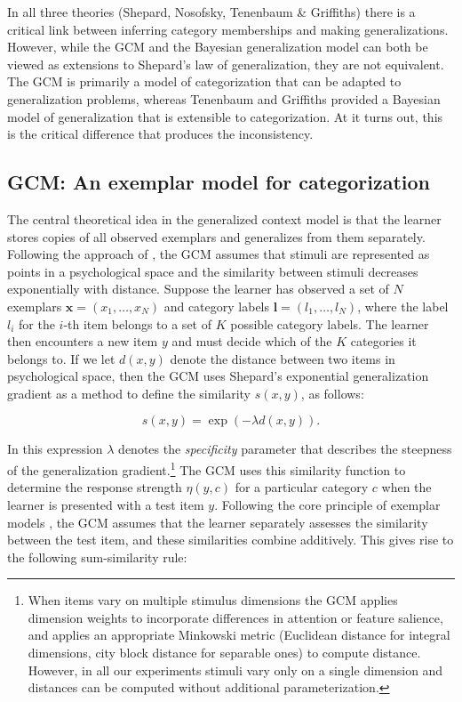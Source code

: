 \documentclass[doc,apacite]{apa6}
\begin{document}
In all three theories (Shepard, Nosofsky, Tenenbaum \& Griffiths) there is a critical link between inferring category memberships and making generalizations. However, while the GCM and the Bayesian generalization model can both be viewed as extensions to Shepard's law of generalization, they are not equivalent. The GCM is primarily a model of categorization that can be adapted to generalization problems, whereas Tenenbaum and Griffiths provided a Bayesian model of generalization that is extensible to categorization. At it turns out, this is the critical difference that produces the inconsistency.

\subsection{GCM: An exemplar model for categorization}

The central theoretical idea in the generalized context model is that the learner stores copies of all observed exemplars and generalizes from them separately. Following the approach of , the GCM assumes that stimuli are represented as points in a psychological space and the similarity between stimuli decreases exponentially with distance. Suppose the learner has observed a set of $N$ exemplars $\bm{x}=(x_1,\ldots,x_N)$ and category labels $\bm{l}=(l_1,\ldots,l_N)$, where the label $l_i$ for the $i$-th item belongs to a set of $K$ possible category labels. The learner then encounters a new item $y$ and must decide which of the $K$ categories it belongs to. If we let $d(x,y)$ denote the distance between two items in psychological space, then the GCM uses Shepard's exponential generalization gradient as a method to define the similarity $s(x,y)$, as follows:

\begin{equation}
\label{gcm1}
s(x,y) = \exp( -\lambda d(x,y) ).
\end{equation}

In this expression $\lambda$ denotes the {\it specificity} parameter that describes the steepness of the generalization gradient.\footnote{When items vary on multiple stimulus dimensions the GCM applies dimension weights to incorporate differences in attention or feature salience, and applies an appropriate Minkowski metric
(Euclidean distance for integral dimensions, city block distance for separable ones)
to compute distance. However, in all our experiments stimuli vary only on a single dimension and distances can be computed without additional parameterization.}
The GCM uses this similarity function to determine the response strength $\eta(y,c)$ for a particular category $c$ when the learner is presented with a test item $y$. Following the core principle of exemplar models \cite{medin1978context}, the GCM assumes that the learner separately assesses the similarity between the test item, and these similarities combine additively. This gives rise to the following sum-similarity rule:
\end{document}

